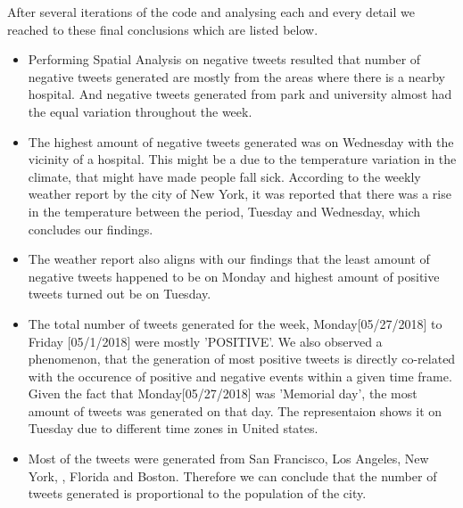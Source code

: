 \documentclass[12pt, oneside]{article}   	%
\begin{document}
After several iterations of the code and analysing each and every detail we reached to these final conclusions which are listed below.

\begin{itemize}
	
	\item Performing Spatial Analysis on negative tweets resulted that number of negative tweets generated are mostly from the areas where there is a nearby hospital. And negative tweets generated from park and university almost had the equal variation throughout the week.
	
	\item The highest amount of negative tweets generated was on Wednesday with the vicinity of a hospital. This might be a due to the temperature variation in the climate, that might have made people fall sick. According to the weekly weather report by the city of New York, it was reported that there was a rise in the temperature between the period, Tuesday and Wednesday, which concludes our findings. 
	
	\item The weather report also aligns with our findings that the least amount of negative tweets happened to be on Monday and highest amount of positive tweets turned out be on Tuesday.
	
	\item The total number of tweets generated for the week, Monday[05/27/2018] to Friday [05/1/2018] were mostly 'POSITIVE'. We also observed a phenomenon, that the generation of most positive tweets is directly co-related with the occurence of positive and negative events within a given time frame. Given the fact that Monday[05/27/2018] was 'Memorial day', the most amount of tweets was generated on that day. The representaion shows it on Tuesday due to different time zones in United states.

	
	\item Most of the tweets were generated from San Francisco, Los Angeles, New York, , Florida and Boston. Therefore we can conclude that the number of tweets generated is proportional to the population of the city.
	
\end{itemize}
\end{document}
